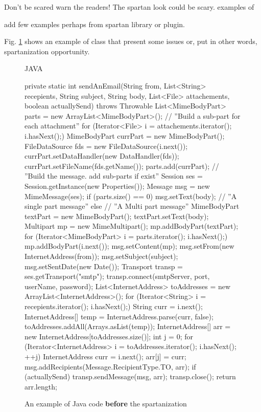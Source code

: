 Don't be scared warn the readers!
The spartan look could be scary.
examples of  

add few examples perhaps from spartan library or plugin. 

Fig. \ref{fig:code-before-spartanization} shows an example of class 
that present some issues or, put in other words, spartanization opportunity. 

\begin{figure}
\begin{code}{JAVA}

private static int sendAnEmail(String from, List<String> recepients, String subject, 
         String body, List<File> attachements, boolean actuallySend)
         throws Throwable {
     List<MimeBodyPart> parts = new ArrayList<MimeBodyPart>();
     // ''Build a sub-part for each attachment''
     for (Iterator<File> i = attachements.iterator(); i.hasNext();) {
         MimeBodyPart currPart = new MimeBodyPart();
         FileDataSource fds = new FileDataSource(i.next());
         currPart.setDataHandler(new DataHandler(fds));
         currPart.setFileName(fds.getName());
         parts.add(currPart);
     }
     // ''Build the message. add sub-parts if exist''
     Session ses = Session.getInstance(new Properties());
     Message msg = new MimeMessage(ses);
     if (parts.size() == 0)
         msg.setText(body); // ''A single part message''
     else {
         // ''A Multi part message''
         MimeBodyPart textPart = new MimeBodyPart();
         textPart.setText(body);
         Multipart mp = new MimeMultipart();
         mp.addBodyPart(textPart);
         for (Iterator<MimeBodyPart> i = parts.iterator(); i.hasNext();)
             mp.addBodyPart(i.next());
         msg.setContent(mp);
     }
     msg.setFrom(new InternetAddress(from));
     msg.setSubject(subject);
     msg.setSentDate(new Date());
     Transport transp = ses.getTransport("smtp");
     transp.connect(smtpServer, port, userName, password);
     List<InternetAddress> toAddresses = new ArrayList<InternetAddress>();
     for (Iterator<String> i = recepients.iterator(); i.hasNext();) {
         String curr = i.next();
         InternetAddress[] temp = InternetAddress.parse(curr, false);
         toAddresses.addAll(Arrays.asList(temp));
     }
     InternetAddress[] arr = new InternetAddress[toAddresses.size()];
     int j = 0;
     for (Iterator<InternetAddress> i = toAddresses.iterator(); i.hasNext(); ++j) {
         InternetAddress curr = i.next();
         arr[j] = curr;
     }
     msg.addRecipients(Message.RecipientType.TO, arr);
     if (actuallySend)
         transp.sendMessage(msg, arr);
     transp.close();
     return arr.length;
 }

\end{code}
\caption{An example of Java code \textbf{before} the spartanization}
\label{fig:code-before-spartanization}
\end{figure}

